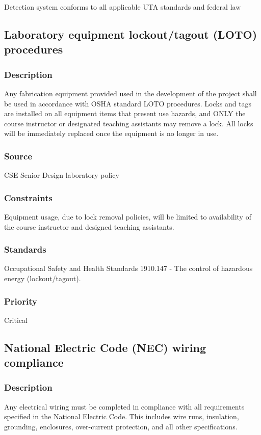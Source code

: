 Detection system conforms to all applicable UTA standards and federal law

\subsection{Laboratory equipment lockout/tagout (LOTO) procedures}
\subsubsection{Description}
Any fabrication equipment provided used in the development of the project shall be used in accordance with OSHA standard LOTO procedures. Locks and tags are installed on all equipment items that present use hazards, and ONLY the course instructor or designated teaching assistants may remove a lock. All locks will be immediately replaced once the equipment is no longer in use.
\subsubsection{Source}
CSE Senior Design laboratory policy
\subsubsection{Constraints}
Equipment usage, due to lock removal policies, will be limited to availability of the course instructor and designed teaching assistants.
\subsubsection{Standards}
Occupational Safety and Health Standards 1910.147 - The control of hazardous energy (lockout/tagout).
\subsubsection{Priority}
Critical

\subsection{National Electric Code (NEC) wiring compliance}
\subsubsection{Description}
Any electrical wiring must be completed in compliance with all requirements specified in the National Electric Code. This includes wire runs, insulation, grounding, enclosures, over-current protection, and all other specifications.
